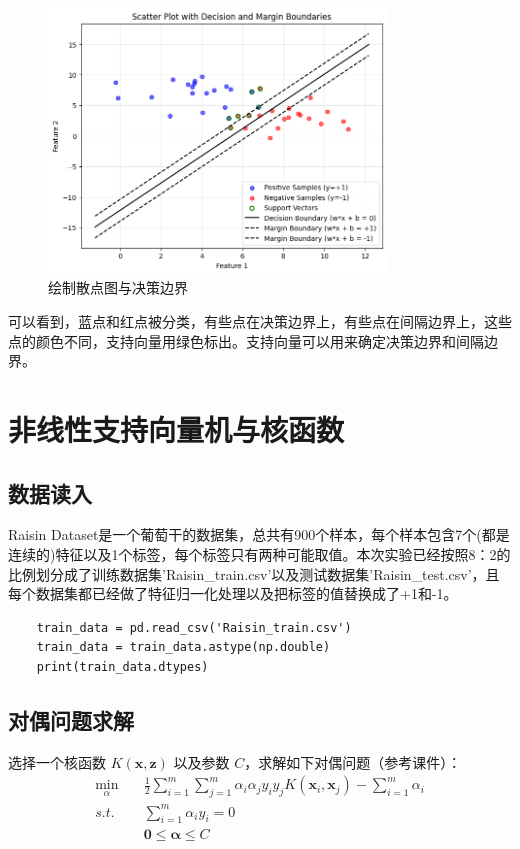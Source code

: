 \documentclass[12pt,a4paper,oneside]{article}
\begin{document}
\begin{figure}[H]
    \centering
    \includegraphics[width=0.8\textwidth]{image/8.png}
    \caption{绘制散点图与决策边界}
\end{figure}
可以看到，蓝点和红点被分类，有些点在决策边界上，有些点在间隔边界上，这些点的颜色不同，支持向量用绿色标出。支持向量可以用来确定决策边界和间隔边界。
\section{非线性支持向量机与核函数}
\subsection{数据读入}
\qquad 
Raisin Dataset是一个葡萄干的数据集，总共有900个样本，每个样本包含7个(都是连续的)特征以及1个标签，每个标签只有两种可能取值。本次实验已经按照8：2的比例划分成了训练数据集'Raisin\_train.csv'以及测试数据集'Raisin\_test.csv'，且每个数据集都已经做了特征归一化处理以及把标签的值替换成了+1和-1。
\begin{lstlisting}
    train_data = pd.read_csv('Raisin_train.csv')
    train_data = train_data.astype(np.double)
    print(train_data.dtypes)    
\end{lstlisting}

\subsection{对偶问题求解}
\qquad 选择一个核函数 $K(\bm{x}, \bm{z})$ 以及参数 $C$，求解如下对偶问题（参考课件）：
$$
\begin{aligned}
\min_\alpha\quad   &\frac{1}{2}\sum_{i=1}^m\sum_{j=1}^m\alpha_i\alpha_jy_iy_jK(\bm{x}_i, \bm{x}_j)-\sum_{i=1}^m\alpha_i \\
s.t. \quad  &\sum_{i=1}^m\alpha_iy_i=0 \\
      &\bm{0}\leq \bm{\alpha}\leq C 
\end{aligned}
$$
\end{document}
